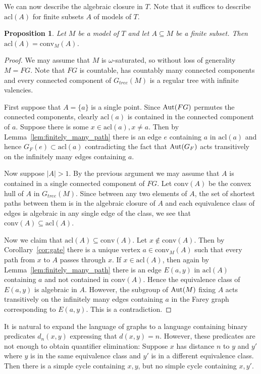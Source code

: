 \documentclass[10pt,a4paper]{amsart}
\newcommand{\conv}{\mathrm{conv}}
\newcommand{\acl}{\mathrm{acl}}
\newtheorem{proposition}[defi]{Proposition}
\def\Aut{\mathop{\rm Aut}\nolimits}
\begin{document}
We can now describe the algebraic closure in $T$. Note that it suffices to describe $\acl(A)$ for finite subsets $A$ of models of $T$. 
\begin{proposition}\label{prop:acl}
Let $M$ be a model of $T$ and let $A\subseteq M$ be a finite subset. Then $\acl(A)=\conv_M(A)$.
\end{proposition}
\begin{proof}
We may assume that $M$ is $\omega$-saturated, so without loss of generality $M=FG$. Note that $FG$ is countable, has countably many connected components and every connected component of $G_{tree}(M)$ is a regular tree with infinite valencies.

First suppose that $A=\{a\}$ is a single point. Since $\Aut(FG)$ permutes the connected components, clearly $\acl(a)$ is contained in the connected component of $a$.
Suppose there is some $x\in\acl(a), x\neq a$. Then by Lemma~\ref{lem:finitely_many_path}  there is an edge $e$ containing $a$ in $\acl(a)$ and hence $G_F(e)\subset \acl(a)$ contradicting the fact that  $\Aut(G_F)$ acts transitively on the infinitely many edges containing $a$.

Now suppose $|A|>1$. By the previous argument we may assume that $A$ is contained in a single connected component of $FG$.  Let $\conv(A)$ be the convex hull of $A$ in $G_{tree}(M)$. Since between any two elements of $A$, the set of shortest paths between them is in the algebraic closure of $A$ and each equivalence class of edges is algebraic in any single edge of the class, we see that $\conv(A)\subseteq\acl(A)$.

Now we claim that $\acl(A)\subseteq\conv(A)$. Let $x\notin\conv(A)$. Then by Corollary~\ref{cor:gate} there is a unique vertex $a\in\conv_M(A)$ such that every path from $x$ to $A$ passes through $x$. If $x\in\acl(A)$, then again by Lemma~\ref{lem:finitely_many_path} there is an edge $E(a,y)$ in $\acl(A)$ containing $a$ and not contained in $\conv(A)$. Hence the equivalence class of $E(a,y)$ is algebraic in $A$. However,  the subgroup of $\Aut(M)$ fixing $A$ acts transitively on the infinitely many edges containing $a$ in the Farey graph corresponding to $E(a,y)$. This is a contradiction.
\end{proof}



It is natural to expand the language of graphs to a language containing
binary predicates $d_n(x,y)$ expressing that $d(x,y)=n$. However, these
predicates are not enough to obtain quantifier elimination: Suppose $x$
has distance $n$ to $y$ and $y'$ where $y$ is in the same equivalence
class and $y'$ is in a different equivalence class. Then there is a
simple cycle containing $x,y$, but no simple cycle containing $x,y'$.
\end{document}

